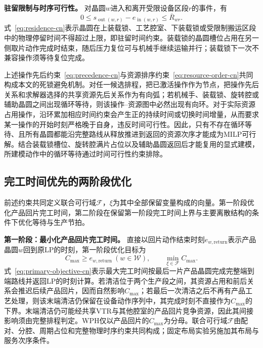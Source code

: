 \documentclass[final,5p,times,twocolumn]{elsarticle}
\begin{document}
\noindent\textbf{驻留限制与时序可行性。}
对晶圆$w$进入和离开受限设备区段$r$的事件，有
\begin{equation}
0\le s_{\operatorname{out}(w,r)}-e_{\operatorname{in}(w,r)}
\le\overline R_{wr}.
\label{eq:residence-cn}
\end{equation}
式~\eqref{eq:residence-cn}表示晶圆在上装载锁、工艺腔室、下装载锁或受限制搬运区段中的物理停留时间不得超过上限，即驻留时间约束。装载锁的晶圆槽位占用在另一侧取片动作完成时结束，随后压力复位可与机械手继续运输并行；装载锁下一次不兼容操作须等待复位完成。

上述操作先后约束~\eqref{eq:precedence-cn}与资源排序约束~\eqref{eq:resource-order-cn}共同构成本文的死锁避免机制。对任一候选排程，把已激活操作作为节点，把操作先后关系和求解器选择的共享资源先后关系作为有向弧；若机械手、装载锁、旋转腔或辅助晶圆之间出现循环等待，则该操作--资源图中必然出现有向环。对于实际资源占用操作，沿环累加相应时间约束会产生正的持续时间或切换时间增量，从而要求某一操作的开始时刻严格晚于自身，违反时间可行性。因此，只有不存在循环等待、且所有晶圆都能沿完整路线从释放推进到返回的资源次序才能成为MILP可行解。结合装载锁槽位、旋转腔满片占位以及辅助晶圆返回后才能复用的显式建模，所建模动作中的循环等待通过时间可行性约束排除。

\subsection{完工时间优先的两阶段优化}
\label{sec:model-objective-cn}

前述约束共同定义联合可行域$\mathcal F$，$\xi$为其中全部保留变量构成的向量。第一阶段优化产品回片完工时间，第二阶段在保留第一阶段完工时间上界与主要离散结构的条件下优化等待与生产节拍。

\noindent\textbf{第一阶段：最小化产品回片完工时间。}
直接以回片动作结束时刻$e_{w,\mathrm{return}}$表示产品晶圆$w$回到原LP的时刻，第一阶段优化目标为
\begin{equation}
C_{\max}\ge e_{w,\mathrm{return}}\ (w\in\mathcal W),\qquad
\min_{\xi\in\mathcal F}C_{\max}.
\label{eq:primary-objective-cn}
\end{equation}
式~\eqref{eq:primary-objective-cn}表示最大完工时间按最后一片产品晶圆完成完整端到端路线并返回LP的时刻计算。若清洁位于两个生产段之间，其资源占用和前后关系会推迟后续产品回片，因而自然影响$C_{\max}$；若最后一次清洁之后不再有产品工艺处理，则该末端清洁仍保留在设备动作序列中，其完成时刻不直接作为$C_{\max}$的下界。末端清洁仍可能经共享VTR与其他腔室的产品回片竞争资源，因此其间接影响须由完整排程判定。WPH仅以产品回片的$C_{\max}$为分母。联合可行域$\mathcal F$由配对、分腔、周期占位和完整物理时序约束共同构成；固定布局实验另施加其布局与服务次序条件。
\end{document}
